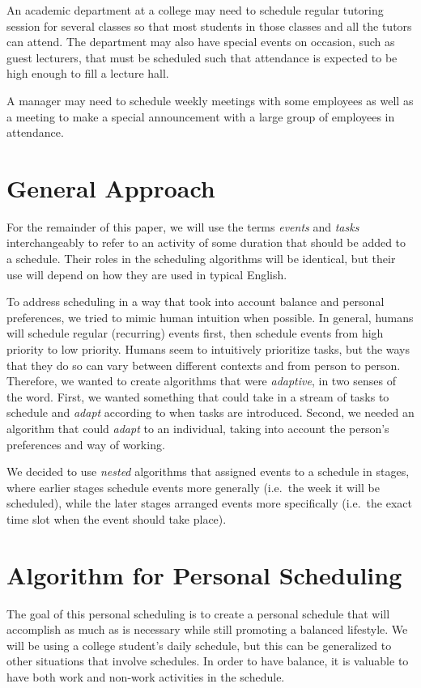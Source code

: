 \documentclass{article}
\newcommand{\todo}[1]{}
\begin{document}
 	An academic department at a college may need to schedule regular tutoring session for several classes so that most students in those classes and all the tutors can attend. The department may also have special events on occasion, such as guest lecturers, that must be scheduled such that attendance is expected to be high enough to fill a lecture hall.
 	
 	A manager may need to schedule weekly meetings with some employees as well as a meeting to make a special announcement with a large group of employees in attendance.

\section{General Approach}
	For the remainder of this paper, we will use the terms \emph{events} and \emph{tasks} interchangeably to refer to an activity of some duration that should be added to a schedule.
	Their roles in the scheduling algorithms will be identical, but their use will depend on how they are used in typical English.

	To address scheduling in a way that took into account balance and personal preferences, we tried to mimic human intuition when possible.
	In general, humans will schedule regular (recurring) events first, then schedule events from high priority to low priority.\todo{CITE THIS: psychology}
	Humans seem to intuitively prioritize tasks, but the ways that they do so can vary between different contexts and from person to person.
	Therefore, we wanted to create algorithms that were \emph{adaptive}, in two senses of the word.
	First, we wanted something that could take in a stream of tasks to schedule and \emph{adapt} according to when tasks are introduced.
	Second, we needed an algorithm that could \emph{adapt} to an individual, taking into account the person's preferences and way of working.

	We decided to use \emph{nested} algorithms that assigned events to a schedule in stages, where earlier stages schedule events more generally (i.e.~the week it will be scheduled), while the later stages arranged events more specifically (i.e.~the exact time slot when the event should take place).

\section{Algorithm for Personal Scheduling}
	The goal of this personal scheduling is to create a personal schedule that will accomplish as much as is necessary while still promoting a balanced lifestyle.
	We will be using a college student's daily schedule, but this can be generalized to other situations that involve schedules.
	In order to have balance, it is valuable to have both work and non-work activities in the schedule.
\end{document}
